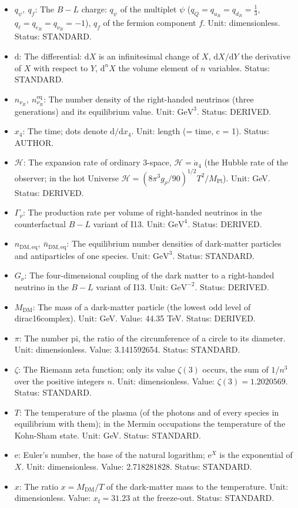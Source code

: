 \documentclass[
  10pt,
]{article}
\begin{document}
\begin{itemize}
\item
  \(q_\psi,\ q_f\): The \(B - L\) charge: \(q_\psi\) of the multiplet
  \(\psi\) (\(q_Q = q_{u_R} = q_{d_R} = \frac13\),
  \(q_\ell = q_{e_R} = q_{\nu_R} = -1\)), \(q_f\) of the fermion
  component \(f\). Unit: dimensionless. Status: STANDARD.
\item
  \(\mathrm{d}\): The differential: \(\mathrm{d}X\) is an infinitesimal
  change of \(X\), \(\mathrm{d}X/\mathrm{d}Y\) the derivative of \(X\)
  with respect to \(Y\), \(\mathrm{d}^nX\) the volume element of \(n\)
  variables. Status: STANDARD.
\item
  \(n_{\nu_R},\ n_{\nu_R}^{\mathrm{eq}}\): The number density of the
  right-handed neutrinos (three generations) and its equilibrium value.
  Unit: \(\mathrm{GeV}^{3}\). Status: DERIVED.
\item
  \(x_4\): The time; dots denote \(\mathrm{d}/\mathrm{d}x_4\). Unit:
  length (= time, c = 1). Status: AUTHOR.
\item
  \(\mathcal{H}\): The expansion rate of ordinary 3-space,
  \(\mathcal{H} = \dot a_4\) (the Hubble rate of the observer; in the
  hot Universe
  \(\mathcal{H} = (8\pi^3g_\rho/90)^{1/2}T^2/M_{\mathrm{Pl}}\)). Unit:
  GeV. Status: DERIVED.
\item
  \(\Gamma_\nu\): The production rate per volume of right-handed
  neutrinos in the counterfactual \(B - L\) variant of I13. Unit:
  \(\mathrm{GeV}^{4}\). Status: DERIVED.
\item
  \(n_{\mathrm{DM,eq}},\ \bar n_{\mathrm{DM,eq}}\): The equilibrium
  number densities of dark-matter particles and antiparticles of one
  species. Unit: \(\mathrm{GeV}^{3}\). Status: STANDARD.
\item
  \(G_\nu\): The four-dimensional coupling of the dark matter to a
  right-handed neutrino in the \(B - L\) variant of I13. Unit:
  \(\mathrm{GeV}^{-2}\). Status: DERIVED.
\item
  \(M_{\mathrm{DM}}\): The mass of a dark-matter particle (the lowest
  odd level of dirac16complex). Unit: GeV. Value: 44.35 TeV. Status:
  DERIVED.
\item
  \(\pi\): The number pi, the ratio of the circumference of a circle to
  its diameter. Unit: dimensionless. Value: 3.141592654. Status:
  STANDARD.
\item
  \(\zeta\): The Riemann zeta function; only its value \(\zeta(3)\)
  occurs, the sum of \(1/n^3\) over the positive integers \(n\). Unit:
  dimensionless. Value: \(\zeta(3) = 1.2020569\). Status: STANDARD.
\item
  \(T\): The temperature of the plasma (of the photons and of every
  species in equilibrium with them); in the Mermin occupations the
  temperature of the Kohn-Sham state. Unit: GeV. Status: STANDARD.
\item
  \(\mathrm{e}\): Euler's number, the base of the natural logarithm;
  \(\mathrm{e}^{X}\) is the exponential of \(X\). Unit: dimensionless.
  Value: 2.718281828. Status: STANDARD.
\item
  \(x\): The ratio \(x = M_{\mathrm{DM}}/T\) of the dark-matter mass to
  the temperature. Unit: dimensionless. Value:
  \(x_{\mathrm{f}} = 31.23\) at the freeze-out. Status: STANDARD.
\end{itemize}
\end{document}
